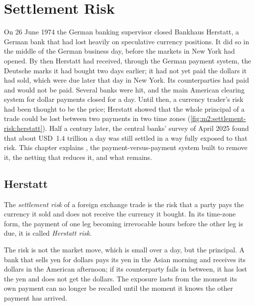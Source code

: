 \chapter{Settlement Risk}\label{ch:m2:settlement-risk}

On 26 June 1974 the German banking supervisor closed Bankhaus Herstatt, a
German bank that had lost heavily on speculative currency positions. It did so
in the middle of the German business day, before the markets in New York had
opened. By then Herstatt had received, through the German payment system, the
Deutsche marks it had bought two days earlier; it had not yet paid the dollars
it had sold, which were due later that day in New York. Its counterparties had
paid and would not be paid. Several banks were hit, and the main American
clearing system for dollar payments closed for a day. Until then, a currency
trader's risk had been thought to be the price; Herstatt showed that the whole
principal of a trade could be lost between two payments in two time zones
(\cref{fig:m2:settlement-risk:herstatt}). Half
a century later, the central banks' survey of April 2025 found that about USD~1.4
trillion a day was still settled in a way fully exposed to that risk. This
chapter explains , the payment-versus-payment system built to
remove it, the netting that reduces it, and what remains.

\section{Herstatt}

\begin{definition}\label{def:m2:settlement-risk:risk}
The \emph{settlement risk} of a foreign exchange trade is
the risk that a party pays the currency it sold and does not receive the currency
it bought. In its time-zone form, the payment of one leg becoming irrevocable
hours before the other leg is due, it is called \emph{Herstatt
risk}.
\end{definition}

The risk is not the market move, which is small over a day, but the principal.
A bank that sells yen for dollars pays its yen in the Asian morning and receives
its dollars in the American afternoon; if its counterparty fails in between, it
has lost the yen and does not get the dollars. The exposure lasts from the
moment its own payment can no longer be recalled until the moment it knows the
other payment has arrived.

